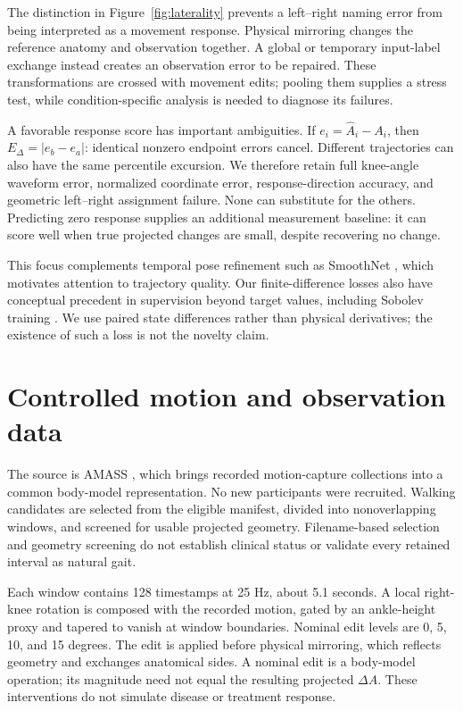 \documentclass{article}
\begin{document}
The distinction in Figure~\ref{fig:laterality} prevents a left--right naming error from being interpreted as a movement response. Physical mirroring changes the reference anatomy and observation together. A global or temporary input-label exchange instead creates an observation error to be repaired. These transformations are crossed with movement edits; pooling them supplies a stress test, while condition-specific analysis is needed to diagnose its failures.

A favorable response score has important ambiguities. If $e_i=\widehat A_i-A_i$, then $E_\Delta=|e_b-e_a|$: identical nonzero endpoint errors cancel. Different trajectories can also have the same percentile excursion. We therefore retain full knee-angle waveform error, normalized coordinate error, response-direction accuracy, and geometric left--right assignment failure. None can substitute for the others. Predicting zero response supplies an additional measurement baseline: it can score well when true projected changes are small, despite recovering no change.

This focus complements temporal pose refinement such as SmoothNet \citep{zeng2022smoothnet}, which motivates attention to trajectory quality. Our finite-difference losses also have conceptual precedent in supervision beyond target values, including Sobolev training \citep{czarnecki2017sobolev}. We use paired state differences rather than physical derivatives; the existence of such a loss is not the novelty claim.

\clearpage
\section{Controlled motion and observation data}
The source is AMASS \citep{mahmood2019amass}, which brings recorded motion-capture collections into a common body-model representation. No new participants were recruited. Walking candidates are selected from the eligible manifest, divided into nonoverlapping windows, and screened for usable projected geometry. Filename-based selection and geometry screening do not establish clinical status or validate every retained interval as natural gait.

Each window contains 128 timestamps at 25 Hz, about 5.1 seconds. A local right-knee rotation is composed with the recorded motion, gated by an ankle-height proxy and tapered to vanish at window boundaries. Nominal edit levels are 0, 5, 10, and 15 degrees. The edit is applied before physical mirroring, which reflects geometry and exchanges anatomical sides. A nominal edit is a body-model operation; its magnitude need not equal the resulting projected $\Delta A$. These interventions do not simulate disease or treatment response.
\end{document}
